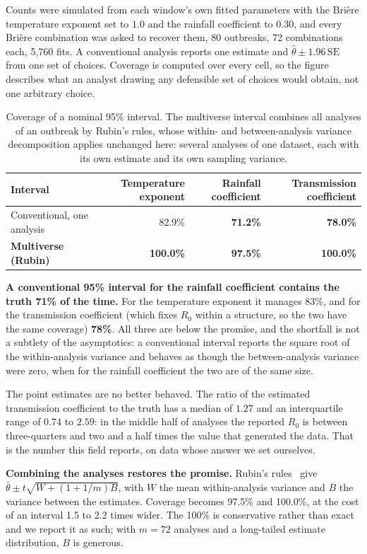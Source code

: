 \documentclass[11pt,a4paper]{article}
\begin{document}
Counts were simulated from each window's own fitted parameters with the Brière
temperature exponent set to $1.0$ and the rainfall coefficient to $0.30$, and
every Brière combination was asked to recover them, 80 outbreaks, 72
combinations each, 5{,}760 fits. A conventional analysis reports one estimate and
$\hat\theta \pm 1.96\,\mathrm{SE}$ from one set of choices. Coverage is computed
over every cell, so the figure describes what an analyst drawing any defensible
set of choices would obtain, not one arbitrary choice.

\begin{table}[htbp]
\centering
\caption{Coverage of a nominal 95\% interval. The multiverse interval combines
all analyses of an outbreak by Rubin's rules, whose within- and between-analysis
variance decomposition applies unchanged here: several analyses of one dataset,
each with its own estimate and its own sampling variance.}
\begin{tabular}{lrrr}
\toprule
Interval & Temperature exponent & Rainfall coefficient & Transmission coefficient \\
\midrule
Conventional, one analysis & 82.9\% & \textbf{71.2\%} & \textbf{78.0\%} \\
\textbf{Multiverse (Rubin)} & \textbf{100.0\%} & \textbf{97.5\%} & \textbf{100.0\%} \\
\bottomrule
\end{tabular}
\end{table}

\textbf{A conventional 95\% interval for the rainfall coefficient contains the
truth 71\% of the time.} For the temperature exponent it manages 83\%, and for the
transmission coefficient (which fixes $R_0$ within a structure, so the two have
the same coverage) \textbf{78\%}. All three are below the promise, and the
shortfall is not a subtlety of the asymptotics: a conventional interval reports the
square root of the within-analysis variance and behaves as though the
between-analysis variance were zero, when for the rainfall coefficient the two are
of the same size.

The point estimates are no better behaved. The ratio of the estimated transmission
coefficient to the truth has a median of $1.27$ and an interquartile range of
$0.74$ to $2.59$: in the middle half of analyses the reported $R_0$ is between
three-quarters and two and a half times the value that generated the data. That is
the number this field reports, on data whose answer we set ourselves.

\textbf{Combining the analyses restores the promise.} Rubin's
rules~\cite{rubin} give
$\bar\theta \pm t\sqrt{W + (1 + 1/m)B}$, with $W$ the mean within-analysis
variance and $B$ the variance between the estimates. Coverage becomes 97.5\% and
100.0\%, at the cost of an interval 1.5 to 2.2 times wider. The 100\% is
conservative rather than exact and we report it as such; with $m = 72$ analyses
and a long-tailed estimate distribution, $B$ is generous.
\end{document}
